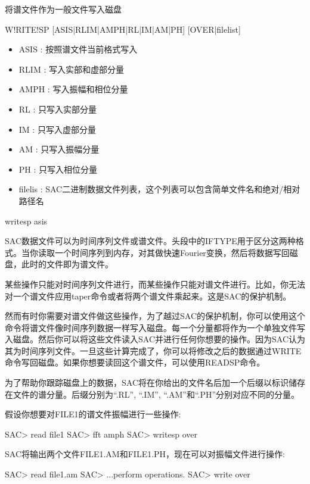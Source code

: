 \label{cmd:writesp}

将谱文件作为一般文件写入磁盘

\begin{SACSTX}
W!RITE!SP [ASIS|RLIM|AMPH|RL|IM|AM|PH] [OVER|filelist]
\end{SACSTX}
 
\begin{itemize}
\item ASIS :  按照谱文件当前格式写入 
\item RLIM :  写入实部和虚部分量 
\item AMPH :  写入振幅和相位分量 
\item RL :  只写入实部分量 
\item IM :  只写入虚部分量 
\item AM :  只写入振幅分量 
\item PH :  只写入相位分量 
\item filelis :  SAC二进制数据文件列表，这个列表可以包含简单文件名和绝对/相对路径名
\end{itemize}

\begin{SACDFT}
writesp asis
\end{SACDFT}

SAC数据文件可以为时间序列文件或谱文件。头段中的IFTYPE用于区分这两种格式。当你读取一个时间序列到内存，对其做快速Fourier变换，然后将数据写回磁盘，此时的文件即为谱文件。

某些操作只能对时间序列文件进行，而某些操作只能对谱文件进行。比如，你无法对一个谱文件应用taper命令或者将两个谱文件乘起来。这是SAC的保护机制。

然而有时你需要对谱文件做这些操作，为了越过SAC的保护机制，你可以使用这个命令将谱文件像时间序列数据一样写入磁盘。每一个分量都将作为一个单独文件写入磁盘。然后你可以将这些文件读入SAC并进行任何你想要的操作。因为SAC认为其为时间序列文件。一旦这些计算完成了，你可以将修改之后的数据通过WRITE命令写回磁盘。如果你想要读回这个谱文件，可以使用READSP命令。

为了帮助你跟踪磁盘上的数据，SAC将在你给出的文件名后加一个后缀以标识储存在文件的谱分量。后缀分别为``.RL'', ``.IM'', ``.AM''和``.PH''分别对应不同的分量。

假设你想要对FILE1的谱文件振幅进行一些操作:
\begin{SACCode}
SAC> read file1
SAC> fft amph
SAC> writesp over
\end{SACCode}

SAC将输出两个文件FILE1.AM和FILE1.PH，现在可以对振幅文件进行操作:
\begin{SACCode}
SAC> read file1.am
SAC> ...perform operations.
SAC> write over
\end{SACCode}

